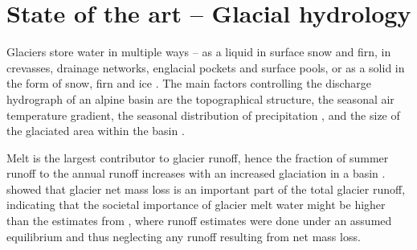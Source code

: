 \documentclass[12pt, a4paper]{article}
\begin{document}
\section{State of the art -- Glacial hydrology}
Glaciers store water in multiple ways -- as a liquid in surface snow and firn,
in crevasses, drainage networks, englacial pockets and surface pools, or as a
solid in the form of snow, firn and ice
\parencite{janssonConceptGlacierStorage2003}. The main factors controlling the
discharge hydrograph of an alpine basin are the topographical structure, the
seasonal air temperature gradient, the seasonal distribution of precipitation
\parencite{zappaSeasonalWaterBalance2003}, and the size of the glaciated area
within the basin \parencite{janssonConceptGlacierStorage2003}. 

Melt is the largest contributor to glacier runoff, hence the fraction of summer
runoff to the annual runoff increases with an increased glaciation in a basin
\parencite{zappaSeasonalWaterBalance2003,chenInfluenceAlpineGlaciers1990}.
\textcite{blissGlobalResponseGlacier2014} showed that glacier net
mass loss is an important part of the total glacier runoff, indicating that the
societal importance of glacier melt water might be higher than the estimates
from \textcite{kaserContributionPotentialGlaciers2010}, where runoff estimates
were done under an assumed equilibrium and thus neglecting any runoff resulting
from net mass loss.


\end{document}
